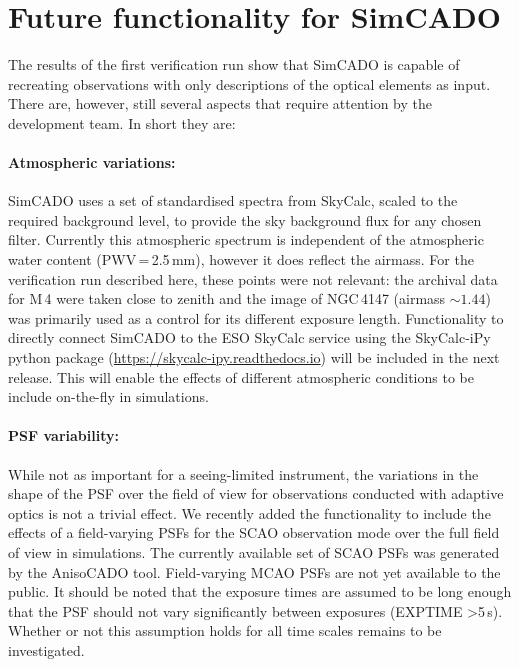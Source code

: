 \section{Future functionality for SimCADO}
\label{sec:future}

The results of the first verification run show that SimCADO is capable of recreating observations with only descriptions of the optical elements as input.
There are, however, still several aspects that require attention by the development team.
In short they are:

\paragraph{Atmospheric variations:}
SimCADO uses a set of standardised spectra from SkyCalc, scaled to the required background level, to provide the sky background flux for any chosen filter.
Currently this atmospheric spectrum is independent of the atmospheric water content (PWV\,=\,2.5\,mm), however it does reflect the airmass.
For the verification run described here, these points were not relevant: the archival data for M\,4 were taken close to zenith and the image of NGC\,4147 (airmass $\sim 1.44$) was primarily used as a control for its different exposure length.
Functionality to directly connect SimCADO to the ESO SkyCalc service using the SkyCalc-iPy python package (\url{https://skycalc-ipy.readthedocs.io}) will be included in the next release.
This will enable the effects of different atmospheric conditions to be include on-the-fly in simulations.

\paragraph{PSF variability:}
While not as important for a seeing-limited instrument, the variations in the shape of the PSF over the field of view for observations conducted with adaptive optics is not a trivial effect.
We recently added the functionality to include the effects of a field-varying PSFs for the SCAO observation mode over the full field of view in simulations.
The currently available set of SCAO PSFs was generated by the AnisoCADO tool.
Field-varying MCAO PSFs are not yet available to the public.
It should be noted that the exposure times are assumed to be long enough that the PSF should not vary significantly between exposures (EXPTIME \textgreater 5\,s).
Whether or not this assumption holds for all time scales remains to be investigated.

